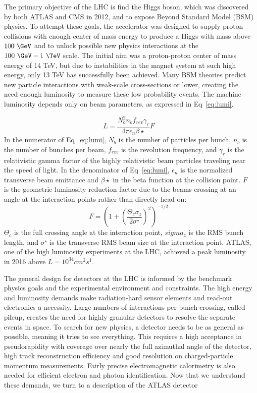 The primary objective of the LHC is find the Higgs boson, which was discovered by both ATLAS and CMS in 2012, and to expose Beyond Standard Model (BSM) physics.  To attempt these goals, the accelerator was designed to supply proton collisions with enough center of mass energy to produce a Higgs with mass above $100~\GeV$ and to unlock possible new physics interactions at the $100~\GeV - 1~\TeV$ scale.  The initial aim was a proton-proton center of mass energy of 14 TeV, but due to instabilities in the magnet system at such high energy, only 13 TeV has successfully been achieved.  Many BSM theories predict new particle interactions with weak-scale cross-sections or lower, creating the need enough luminosity to measure these low probability events.  The machine luminosity depends only on beam parameters, as expressed in Eq~\ref{eq:lumi}.

\begin{equation}
L=\frac{N_b^2n_bf_{rev}\gamma_r}{4\pi\epsilon_n\beta\star}F
\label{eq:lumi}
\end{equation}
In the numerator of Eq~\ref{eq:lumi}, $N_b$ is the number of particles per bunch, $n_b$ is the number of bunches per beam, $f_{rev}$ is the revolution frequency, and $\gamma_r$ is the relativistic gamma factor of the highly relativistic beam particles traveling near the speed of light.  In the denominator of Eq~\ref{eq:lumi}, $\epsilon_n$ is the normalized transverse beam emittance and $\beta\star$ in the beta function at the collision point.  $F$ is the geometric luminosity reduction factor due to the beams crossing at an angle at the interaction points rather than directly head-on:
\begin{equation}
F=(1+(\frac{\Theta_c\sigma_z}{2\sigma^{\star}})^2)^{-1/2}
\label{eq:reduction}
\end{equation}
$\Theta_c$ is the full crossing angle at the interaction point, $sigma_z$ is the RMS bunch length, and $\sigma^{\star}$ is the transverse RMS beam size at the interaction point.  ATLAS, one of the high luminosity experiments at the LHC, achieved a peak luminosity in 2016 above $L=10^{34}cm^2s^1$.

 

The general design for detectors at the LHC is informed by the benchmark physics goals and the experimental environment and constraints.  The high energy and luminosity demands make radiation-hard sensor elements and read-out electronics a necessity.  Large numbers of interactions per bunch crossing, called pileup, creates the need for highly granular detectors to resolve the separate events in space.  To search for new physics, a detector needs to be as general as possible, meaning it tries to see everything.  This requires a high acceptance in pseudorapidity with coverage over nearly the full azimuthal angle of the detector, high track reconstruction efficiency and good resolution on charged-particle momentum measurements.  Fairly precise electromagnetic calorimetry is also needed for efficient electron and photon identification.  Now that we understand these demands, we turn to a description of the ATLAS detector 

